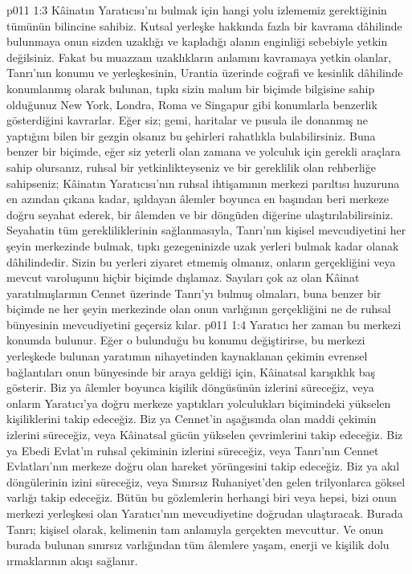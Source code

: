 \vs p011 1:3 Kâinatın Yaratıcısı’nı bulmak için hangi yolu izlememiz gerektiğinin tümünün bilincine sahibiz. Kutsal yerleşke hakkında fazla bir kavrama dâhilinde bulunmaya onun sizden uzaklığı ve kapladığı alanın enginliği sebebiyle yetkin değilsiniz. Fakat bu muazzam uzaklıkların anlamını kavramaya yetkin olanlar, Tanrı’nın konumu ve yerleşkesinin, Urantia üzerinde coğrafi ve kesinlik dâhilinde konumlanmış olarak bulunan, tıpkı sizin malum bir biçimde bilgisine sahip olduğunuz New York, Londra, Roma ve Singapur gibi konumlarla benzerlik gösterdiğini kavrarlar. Eğer siz; gemi, haritalar ve pusula ile donanmış ne yaptığını bilen bir gezgin olsanız bu şehirleri rahatlıkla bulabilirsiniz. Buna benzer bir biçimde, eğer siz yeterli olan zamana ve yolculuk için gerekli araçlara sahip olursanız, ruhsal bir yetkinlikteyseniz ve bir gereklilik olan rehberliğe sahipseniz; Kâinatın Yaratıcısı’nın ruhsal ihtişamının merkezi parıltısı huzuruna en azından çıkana kadar, ışıldayan âlemler boyunca en başından beri merkeze doğru seyahat ederek, bir âlemden ve bir döngüden diğerine ulaştırılabilirsiniz. Seyahatin tüm gerekliliklerinin sağlanmasıyla, Tanrı’nın kişisel mevcudiyetini her şeyin merkezinde bulmak, tıpkı gezegeninizde uzak yerleri bulmak kadar olanak dâhilindedir. Sizin bu yerleri ziyaret etmemiş olmanız, onların gerçekliğini veya mevcut varoluşunu hiçbir biçimde dışlamaz. Sayıları çok az olan Kâinat yaratılmışlarının Cennet üzerinde Tanrı’yı bulmuş olmaları, buna benzer bir biçimde ne her şeyin merkezinde olan onun varlığının gerçekliğini ne de ruhsal bünyesinin mevcudiyetini geçersiz kılar.
\vs p011 1:4 Yaratıcı her zaman bu merkezi konumda bulunur. Eğer o bulunduğu bu konumu değiştirirse, bu merkezi yerleşkede bulunan yaratımın nihayetinden kaynaklanan çekimin evrensel bağlantıları onun bünyesinde bir araya geldiği için, Kâinatsal karışıklık baş gösterir. Biz ya âlemler boyunca kişilik döngüsünün izlerini süreceğiz, veya onların Yaratıcı’ya doğru merkeze yaptıkları yolculukları biçimindeki yükselen kişiliklerini takip edeceğiz. Biz ya Cennet’in aşağısında olan maddi çekimin izlerini süreceğiz, veya Kâinatsal gücün yükselen çevrimlerini takip edeceğiz. Biz ya Ebedi Evlat’ın ruhsal çekiminin izlerini süreceğiz, veya Tanrı'nın Cennet Evlatları’nın merkeze doğru olan hareket yörüngesini takip edeceğiz. Biz ya akıl döngülerinin izini süreceğiz, veya Sınırsız Ruhaniyet’den gelen trilyonlarca göksel varlığı takip edeceğiz. Bütün bu gözlemlerin herhangi biri veya hepsi, bizi onun merkezi yerleşkesi olan Yaratıcı’nın mevcudiyetine doğrudan ulaştıracak. Burada Tanrı; kişisel olarak, kelimenin tam anlamıyla gerçekten mevcuttur. Ve onun burada bulunan sınırsız varlığından tüm âlemlere yaşam, enerji ve kişilik dolu ırmaklarının akışı sağlanır.
